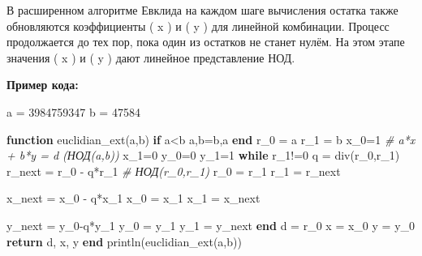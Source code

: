 \documentclass[
]{article}
\newenvironment{Shaded}{}{}
\newcommand{\CommentTok}[1]{\textcolor[rgb]{0.38,0.63,0.69}{\textit{#1}}}
\newcommand{\ControlFlowTok}[1]{\textcolor[rgb]{0.00,0.44,0.13}{\textbf{#1}}}
\newcommand{\FloatTok}[1]{\textcolor[rgb]{0.25,0.63,0.44}{#1}}
\newcommand{\FunctionTok}[1]{\textcolor[rgb]{0.02,0.16,0.49}{#1}}
\newcommand{\KeywordTok}[1]{\textcolor[rgb]{0.00,0.44,0.13}{\textbf{#1}}}
\newcommand{\NormalTok}[1]{#1}
\newcommand{\OperatorTok}[1]{\textcolor[rgb]{0.40,0.40,0.40}{#1}}
\begin{document}
В расширенном алгоритме Евклида на каждом шаге вычисления остатка также
обновляются коэффициенты ( x ) и ( y ) для линейной комбинации. Процесс
продолжается до тех пор, пока один из остатков не станет нулём. На этом
этапе значения ( x ) и ( y ) дают линейное представление НОД.

\textbf{Пример кода:}

\begin{Shaded}
\begin{Highlighting}[]
\NormalTok{a }\OperatorTok{=} \FloatTok{3984759347}
\NormalTok{b }\OperatorTok{=} \FloatTok{47584}

\KeywordTok{function} \FunctionTok{euclidian\_ext}\NormalTok{(a,b)}
    \ControlFlowTok{if}\NormalTok{ a}\OperatorTok{\textless{}}\NormalTok{b}
\NormalTok{        a,b}\OperatorTok{=}\NormalTok{b,a}
    \ControlFlowTok{end}
\NormalTok{    r\_0 }\OperatorTok{=}\NormalTok{ a}
\NormalTok{    r\_1 }\OperatorTok{=}\NormalTok{ b}
\NormalTok{    x\_0}\OperatorTok{=}\FloatTok{1} \CommentTok{\# a*x + b*y = d (НОД(a,b))}
\NormalTok{    x\_1}\OperatorTok{=}\FloatTok{0} 
\NormalTok{    y\_0}\OperatorTok{=}\FloatTok{0}
\NormalTok{    y\_1}\OperatorTok{=}\FloatTok{1}
    \ControlFlowTok{while}\NormalTok{ r\_1}\OperatorTok{!=}\FloatTok{0}
\NormalTok{        q }\OperatorTok{=} \FunctionTok{div}\NormalTok{(r\_0,r\_1)}
\NormalTok{        r\_next }\OperatorTok{=}\NormalTok{ r\_0 }\OperatorTok{{-}}\NormalTok{ q}\OperatorTok{*}\NormalTok{r\_1 }\CommentTok{\# НОД(r\_0,r\_1)}
\NormalTok{        r\_0 }\OperatorTok{=}\NormalTok{ r\_1}
\NormalTok{        r\_1 }\OperatorTok{=}\NormalTok{ r\_next}

\NormalTok{        x\_next }\OperatorTok{=}\NormalTok{ x\_0 }\OperatorTok{{-}}\NormalTok{ q}\OperatorTok{*}\NormalTok{x\_1}
\NormalTok{        x\_0 }\OperatorTok{=}\NormalTok{ x\_1}
\NormalTok{        x\_1 }\OperatorTok{=}\NormalTok{ x\_next}

\NormalTok{        y\_next }\OperatorTok{=}\NormalTok{ y\_0}\OperatorTok{{-}}\NormalTok{q}\OperatorTok{*}\NormalTok{y\_1}
\NormalTok{        y\_0 }\OperatorTok{=}\NormalTok{ y\_1}
\NormalTok{        y\_1 }\OperatorTok{=}\NormalTok{ y\_next}
    \ControlFlowTok{end} 
\NormalTok{    d }\OperatorTok{=}\NormalTok{ r\_0}
\NormalTok{    x }\OperatorTok{=}\NormalTok{ x\_0}
\NormalTok{    y }\OperatorTok{=}\NormalTok{ y\_0}
    \ControlFlowTok{return}\NormalTok{ d, x, y}
\KeywordTok{end}
\FunctionTok{println}\NormalTok{(}\FunctionTok{euclidian\_ext}\NormalTok{(a,b))}
\end{Highlighting}
\end{Shaded}
\end{document}
